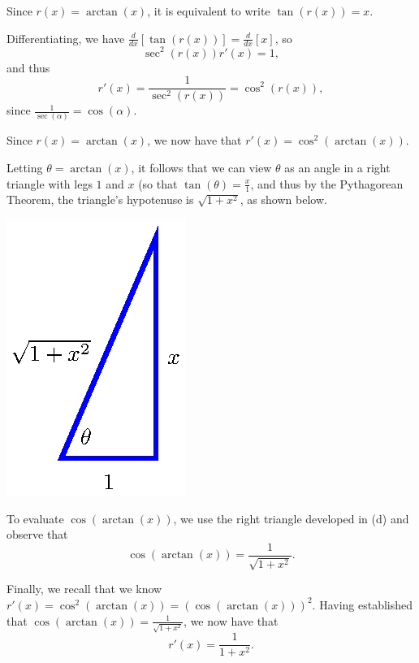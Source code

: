 \begin{activitySolution}
\ba
	\item Since $r(x) = \arctan(x)$, it is equivalent to write $\tan(r(x)) = x$.
	\item Differentiating, we have $\frac{d}{dx}[\tan(r(x))] = \frac{d}{dx}[x]$, so
	$$\sec^2(r(x)) r'(x) = 1,$$
	and thus 
	$$r'(x) = \frac{1}{\sec^2(r(x))} = \cos^2(r(x)),$$
	since $\frac{1}{\sec(\alpha)} = \cos(\alpha).$
	\item Since $r(x) = \arctan(x)$, we now have that $r'(x) = \cos^2(\arctan(x)).$
	\item Letting $\theta = \arctan(x)$, it follows that we can view $\theta$ as an angle in a right triangle with legs $1$ and $x$ (so that $\tan(\theta) = \frac{x}{1}$, and thus by the Pythagorean Theorem, the triangle's hypotenuse is $\sqrt{1+x^2}$, as shown below.
	\begin{center}
	\includegraphics{figures/2_6_cosarctan.eps}
	\end{center}
	\item To evaluate $\cos(\arctan(x))$, we use the right triangle developed in (d) and observe that 
	$$\cos(\arctan(x)) = \frac{1}{\sqrt{1+x^2}}.$$
	\item Finally, we recall that we know $r'(x) = \cos^2(\arctan(x)) = \left( \cos(\arctan(x)) \right)^2$.  Having established that $\cos(\arctan(x)) = \frac{1}{\sqrt{1+x^2}}$, we now have that
	$$r'(x) = \frac{1}{1+x^2}.$$
\ea
\end{activitySolution}
\aftera